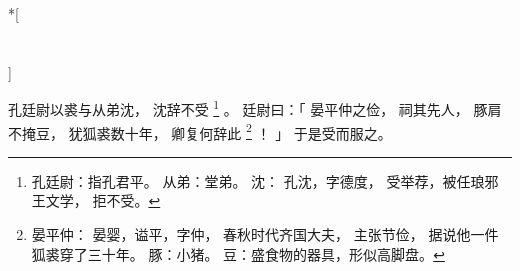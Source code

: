 
\switchcolumn[0]*[\section{}]

孔廷尉以裘与从弟沈，
沈辞不受%
\footnote{%
    孔廷尉：指孔君平。
    从弟：堂弟。
    沈：
        孔沈，字德度，
        受举荐，被任琅邪王文学，
        拒不受。
}%
。
廷尉曰：「
    晏平仲之俭，
    祠其先人，
    豚肩不掩豆，
    犹狐裘数十年，
    卿复何辞此%
    \footnote{%
        晏平仲：
            晏婴，谥平，字仲，
            春秋时代齐国大夫，
            主张节俭，
            据说他一件狐裘穿了三十年。
        豚：小猪。
        豆：盛食物的器具，形似高脚盘。
    }%
    ！
」
于是受而服之。

\switchcolumn


